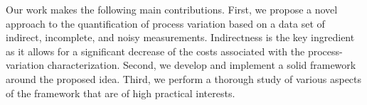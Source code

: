 Our work makes the following main contributions. First, we propose a novel approach to the quantification of process variation based on a data set of indirect, incomplete, and noisy measurements. Indirectness is the key ingredient as it allows for a significant decrease of the costs associated with the process-variation characterization.
Second, we develop and implement a solid framework around the proposed idea. Third, we perform a thorough study of various aspects of the framework that are of high practical interests.

